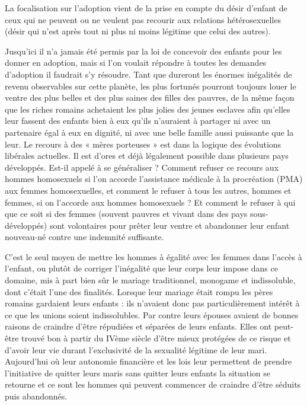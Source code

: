 La focalisation sur l'adoption vient de la prise en compte du désir d'enfant de ceux qui ne peuvent ou ne veulent pas recourir aux relations hétérosexuelles (désir qui n'est après tout ni plus ni moins légitime que celui des autres). 

Jusqu'ici il n'a jamais été permis par la loi de concevoir des enfants pour les donner en adoption, mais si l'on voulait répondre à toutes les demandes d'adoption il faudrait s'y résoudre. Tant que dureront les énormes inégalités de revenu observables sur cette planète, les plus fortunés pourront toujours louer le ventre des plus belles et des plus saines des filles des pauvres, de la même façon que les riches romains achetaient les plus jolies des jeunes esclaves afin qu'elles leur fassent des enfants bien à eux qu'ils n'auraient à partager ni avec un partenaire égal à eux en dignité, ni avec une belle famille aussi puissante que la leur. Le recours à des « mères porteuses » est dans la logique des évolutions libérales actuelles. Il est d'ores et déjà légalement possible dans plusieurs pays développés. Est-il appelé à se généraliser ? Comment refuser ce recours aux hommes homosexuels si l'on accorde l'assistance médicale à la procréation (PMA) aux femmes homosexuelles, et comment le refuser à tous les autres, hommes et femmes, si on l'accorde aux hommes homosexuels ? Et comment le refuser à qui que ce soit si des femmes (souvent pauvres et vivant dans des pays sous-développés) sont volontaires pour prêter leur ventre et abandonner leur enfant nouveau-né contre une indemnité suffisante. 

 C'est le seul moyen de mettre les hommes à égalité avec les femmes dans l'accès à l'enfant, ou plutôt de corriger l'inégalité que leur corps leur impose dans ce domaine, mis à part bien sûr le mariage traditionnel, monogame et indissoluble, dont c'était l'une des finalités. Lorsque leur mariage était rompu les pères romains gardaient leurs enfants : ils n'avaient donc pas particulièrement intérêt à ce que les unions soient indissolubles. Par contre leurs épouses avaient de bonnes raisons de craindre d'être répudiées et séparées de leurs enfants. Elles ont peut-être trouvé bon à partir du IVème siècle d'être mieux protégées de ce risque et d'avoir leur vie durant l'exclusivité de la sexualité légitime de leur mari. Aujourd'hui où leur autonomie financière et les lois leur permettent de prendre l'initiative de quitter leurs maris sans quitter leurs enfants la situation se retourne et ce sont les hommes qui peuvent commencer de craindre d'être séduits puis abandonnés. 
 
